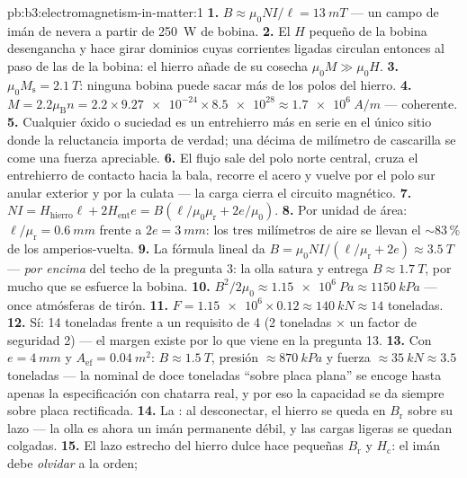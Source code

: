 \begin{solution}{pb:b3:electromagnetism-in-matter:1}
\textbf{1.} $B \approx \mu_0NI/\ell = \qty{13}{mT}$ --- un
campo de imán de nevera a partir de \qty{250}{W} de bobina.
\textbf{2.} El $H$ pequeño de la bobina desengancha y hace girar dominios cuyas
corrientes ligadas circulan entonces al paso de las de la bobina: el hierro
añade de su cosecha $\mu_0M \gg \mu_0H$.
\textbf{3.} $\mu_0M_{\text{s}} = \qty{2.1}{T}$: ninguna bobina puede sacar
más de los polos del hierro.
\textbf{4.} $M = 2.2\mu_{\text{B}}n = 2.2\times\num{9.27e-24}
\times\num{8.5e28} \approx \qty{1.7e6}{A/m}$ --- coherente.
\textbf{5.} Cualquier óxido o suciedad es un entrehierro más en serie en el único
sitio donde la reluctancia importa de verdad; una décima de milímetro de cascarilla
se come una fuerza apreciable.
\textbf{6.} El flujo sale del polo norte central, cruza el
entrehierro de contacto hacia la bala, recorre el acero y vuelve
por el polo sur anular exterior y por la culata --- la carga
cierra el circuito magnético.
\textbf{7.} $NI = H_{\text{hierro}}\ell + 2H_{\text{ent}}e =
B(\ell/\mu_0\mu_{\text{r}} + 2e/\mu_0)$.
\textbf{8.} Por unidad de área: $\ell/\mu_{\text{r}} = \qty{0.6}{mm}$
frente a $2e = \qty{3}{mm}$: los tres milímetros de aire se llevan
el $\sim83\,\%$ de los amperios-vuelta.
\textbf{9.} La fórmula lineal da $B = \mu_0NI/(\ell/
\mu_{\text{r}} + 2e) \approx \qty{3.5}{T}$ --- \emph{por encima} del
techo de la pregunta 3: la olla satura y entrega $B \approx
\qty{1.7}{T}$, por mucho que se esfuerce la bobina.
\textbf{10.} $B^2/2\mu_0 \approx \qty{1.15e6}{Pa} \approx
\qty{1150}{kPa}$ --- once atmósferas de tirón.
\textbf{11.} $F = \num{1.15e6}\times0.12 \approx \qty{140}{kN}
\approx 14$ toneladas.
\textbf{12.} Sí: 14 toneladas frente a un requisito de 4
(2 toneladas $\times$ un factor de seguridad 2) --- el margen existe por
lo que viene en la pregunta 13.
\textbf{13.} Con $e = \qty{4}{mm}$ y $A_{\text{ef}} =
\qty{0.04}{m^2}$: $B \approx \qty{1.5}{T}$, presión
$\approx\qty{870}{kPa}$ y fuerza $\approx\qty{35}{kN} \approx 3.5$
toneladas --- la nominal de doce toneladas ``sobre placa plana'' se encoge hasta
apenas la especificación con chatarra real, y por eso la capacidad se da siempre
sobre placa rectificada.
\textbf{14.} La : al desconectar, el hierro se queda en
$B_{\text{r}}$ sobre su lazo --- la olla es ahora un imán permanente
débil, y las cargas ligeras se quedan colgadas.
\textbf{15.} El lazo estrecho del hierro dulce hace pequeñas $B_{\text{r}}$ y
$H_{\text{c}}$: el imán debe \emph{olvidar} a la orden;

\end{solution}
